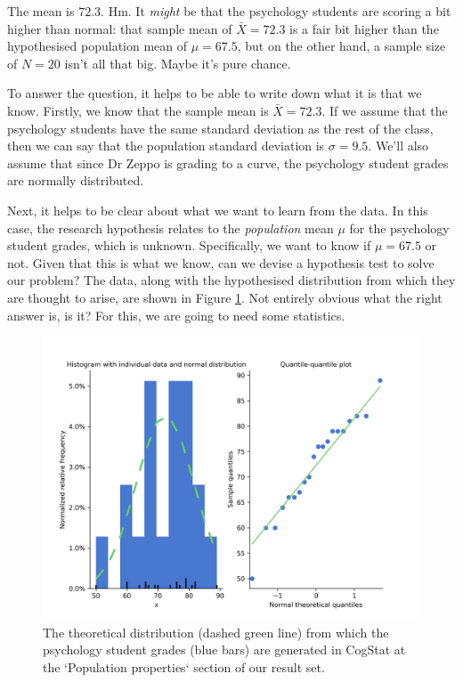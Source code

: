\documentclass[
]{book}
\theoremstyle{definition}
\theoremstyle{definition}
\theoremstyle{definition}
\theoremstyle{definition}
\theoremstyle{remark}
\begin{document}
The mean is \(72.3\). Hm. It \emph{might} be that the psychology students are scoring a bit higher than normal: that sample mean of \(\bar{X} = 72.3\) is a fair bit higher than the hypothesised population mean of \(\mu = 67.5\), but on the other hand, a sample size of \(N = 20\) isn't all that big. Maybe it's pure chance.

To answer the question, it helps to be able to write down what it is that we know. Firstly, we know that the sample mean is \(\bar{X} = 72.3\). If we assume that the psychology students have the same standard deviation as the rest of the class, then we can say that the population standard deviation is \(\sigma = 9.5\). We'll also assume that since Dr Zeppo is grading to a curve, the psychology student grades are normally distributed.

Next, it helps to be clear about what we want to learn from the data. In this case, the research hypothesis relates to the \emph{population} mean \(\mu\) for the psychology student grades, which is unknown. Specifically, we want to know if \(\mu = 67.5\) or not. Given that this is what we know, can we devise a hypothesis test to solve our problem? The data, along with the hypothesised distribution from which they are thought to arise, are shown in Figure \ref{fig:zeppo}. Not entirely obvious what the right answer is, is it? For this, we are going to need some statistics.

\begin{figure}

{\centering \includegraphics[width=0.66\linewidth]{resources/image/zeppohist} 

}

\caption{The theoretical distribution (dashed green line) from which the psychology student grades (blue bars) are generated in CogStat at the `Population properties` section of our result set.}\label{fig:zeppo}
\end{figure}
\end{document}
